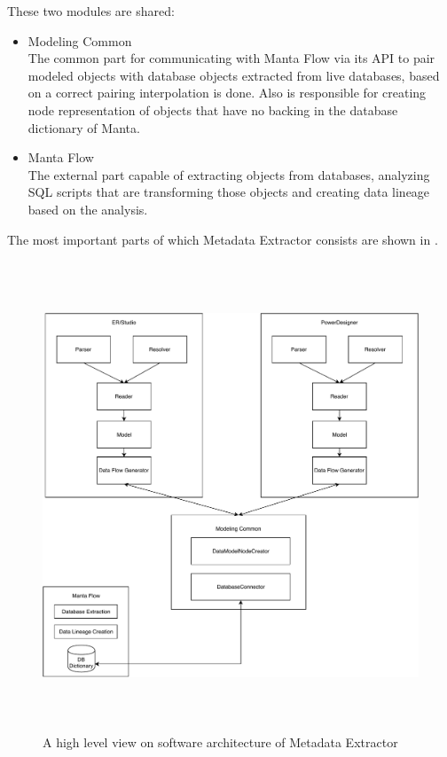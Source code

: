 These two modules are shared:
\begin{itemize}
	\item Modeling Common \\
	The common part for communicating with Manta Flow via its API to pair modeled objects with database objects extracted from live databases, based on a correct pairing interpolation is done. Also is responsible for creating node representation of objects that have no backing in the database dictionary of Manta.
	\item Manta Flow \\
	The external part capable of extracting objects from databases, analyzing SQL scripts that are transforming those objects and creating data lineage based on the analysis.
\end{itemize}

The most important parts of which Metadata Extractor consists are shown in .

\begin{figure}[H]
	\centering
	\includegraphics[height=14cm]{../img/SWArchitecture}
	\caption[Metadata Extractor Software Architecture]{A high level view on software architecture of Metadata Extractor}
	\label{SWArchitecture}
\end{figure}